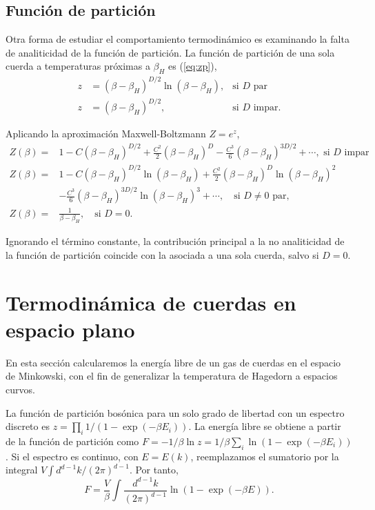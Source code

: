 \subsection{Función de partición}

Otra forma de estudiar el comportamiento termodinámico es examinando la falta de analiticidad de la función de partición.
La función de partición de una sola cuerda a temperaturas próximas a $\beta_H$ es (\ref{eq:zp}),
\begin{equation}
  \begin{aligned}
    z&=(\beta-\beta_H)^{D/2}\ln(\beta-\beta_H), &\text{si $D$ par}\\
    z&=(\beta-\beta_H)^{D/2}, &\text{si $D$ impar}.
  \end{aligned}
\end{equation}

Aplicando la aproximación Maxwell-Boltzmann $Z=e^z$,
\begin{equation}
  \begin{aligned}
   Z(\beta)= &1-C(\beta-\beta_H)^{D/2} +\frac{C^2}{2}(\beta-\beta_H)^D-\frac{C^3}{6}(\beta-\beta_H)^{3D/2}+\cdots, \text{ si $D$ impar}\\
   Z(\beta)= &1-C(\beta-\beta_H)^{D/2}\ln(\beta-\beta_H) +\frac{C^2}{2}(\beta-\beta_H)^D\ln(\beta-\beta_H) ^2\\
         &-\frac{C^3}{6}(\beta-\beta_H)^{3D/2}\ln(\beta-\beta_H)^3 +\cdots, \quad \text{si $D\neq 0$ par},\\
   Z(\beta)=& \frac{1}{\beta-\beta_H}, \quad \text{si $D=0$}.
  \end{aligned}
\end{equation}

Ignorando el término constante, la contribución principal a la no analiticidad de la función de partición coincide
con la asociada a una sola cuerda, salvo si $D=0$.


\section{Termodinámica de cuerdas en espacio plano}

\label{sec:free}

En esta sección calcularemos la energía libre de un gas de cuerdas en el espacio de Minkowski,
con el fin de generalizar la temperatura de Hagedorn a espacios curvos.

La función de partición bosónica para un solo grado de libertad con un espectro discreto es $z=\prod_i 1/(1-\exp(-\beta E_i))$.
La energía libre se obtiene a partir de la función de partición como $F=-1/\beta \ln z=1/\beta\sum_i \ln(1-\exp(-\beta E_i))$.
Si el espectro es continuo, con $E=E(k)$, reemplazamos el sumatorio por la integral $V\int d^{d-1}k/(2\pi)^{d-1}$.
Por tanto,
\begin{equation}
  F=\frac{V}{\beta}\int \frac{d^{d-1}k}{(2\pi)^{d-1}}\ln(1-\exp(-\beta E)).
\end{equation}

